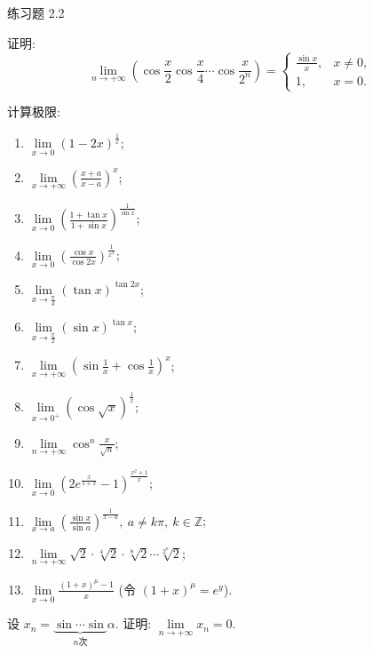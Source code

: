 \begin{exblock}{练习题 2.2}
\item 证明:
  \[
  \lim_{n\to+\infty}\left(\cos\frac{x}{2}\cos\frac{x}{4}\cdots\cos\frac{x}{2^n}\right)=\begin{cases}
  \frac{\sin x}{x}, & x\neq 0, \\
  1, & x=0.
\end{cases}
\]

\item 计算极限:
  \begin{enumerate}[label=(\arabic*)]
    \item $\lim\limits_{x \to 0} (1 - 2x)^{\frac{1}{x}}$;
    \item $\lim\limits_{x \to +\infty} \left( \frac{x+a}{x-a} \right)^x$;
    \item $\lim\limits_{x \to 0} \left( \frac{1 + \tan x}{1 + \sin x} \right)^{\frac{1}{\sin x}}$;
    \item $\lim\limits_{x \to 0} \left( \frac{\cos x}{\cos 2x} \right)^{\frac{1}{x^2}}$;
    \item $\lim\limits_{x \to \frac{\pi}{4}}(\tan x)^{\tan 2x}$;
    \item $\lim\limits_{x \to \frac{\pi}{2}}(\sin x)^{\tan x}$;
    \item $\lim\limits_{x \to +\infty} \left( \sin \frac{1}{x} + \cos \frac{1}{x} \right)^x$;
    \item $\lim\limits_{x \to 0^+} (\cos \sqrt{x})^{\frac{1}{x}}$;
    \item $\lim\limits_{n\to+\infty}\cos^{n}\frac{x}{\sqrt{n}}$;
    \item $\lim\limits_{x \to 0} \left(2e^{\frac{x}{1+x}} - 1\right)^{\frac{x^2 + 1}{x}}$;
    \item $\lim\limits_{x \to a} \left( \frac{\sin x}{\sin a} \right)^{\frac{1}{x - a}},\ a \neq k\pi,\ k \in \mathbb{Z}$;
    \item $\lim\limits_{n \to +\infty} \sqrt{2} \cdot \sqrt[4]{2} \cdot \sqrt[8]{2} \cdots \sqrt[2^n]{2}$;
    \item $\lim\limits_{x\to 0}\frac{(1+x)^{\mu}-1}{x}$ (令 $(1+x)^{\mu}=e^{y}$).
  \end{enumerate}

\item 设 $x_{n}=\underbrace{\sin\cdots\sin}_{n\text{次}}\alpha$. 证明: $\lim\limits_{n\to+\infty}x_{n}=0$.
\end{exblock}

